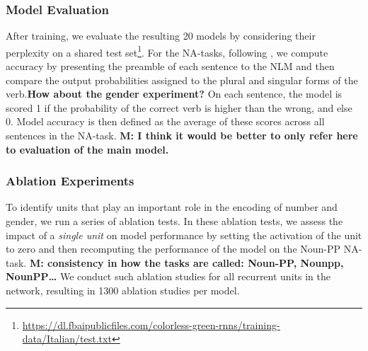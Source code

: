 \subsubsection{Model Evaluation} After training, we evaluate the resulting 20 models by considering their perplexity on a shared test set\footnote{\url{https://dl.fbaipublicfiles.com/colorless-green-rnns/training-data/Italian/test.txt}}. For the NA-tasks, following \citet{Linzen:etal:2016}, we compute accuracy by presenting the preamble of each sentence to the NLM and then compare the output probabilities assigned to the plural and singular forms of the verb.\textbf{How about the gender experiment?} On each sentence, the model is scored 1 if the probability of the correct verb is higher than the wrong, and else 0. Model accuracy is then defined as the average of these scores across all sentences in the NA-task. \textbf{M: I think it would be better to only refer here to evaluation of the main model.}

\subsubsection{Ablation Experiments}
To identify units that play an important role in the encoding of number and gender, we run a series of ablation tests.
In these ablation tests, we assess the impact of a \emph{single unit} on model performance by setting the activation of the unit to zero and then recomputing the performance of the model on the Noun-PP NA-task. \textbf{M: consistency in how the tasks are called: Noun-PP, Nounpp, NounPP\ldots} 
We conduct such ablation studies for all recurrent units in the network, resulting in 1300 ablation studies per model.

